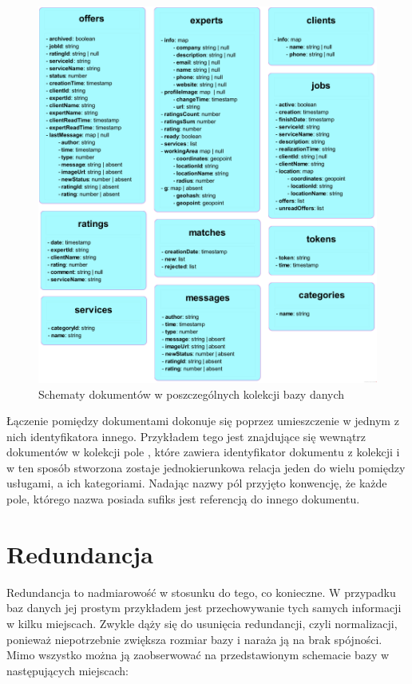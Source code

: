 \begin{figure}[ht!]
  \centering
  \includegraphics[width=\linewidth]{images/db_documents.png}
  \caption{Schematy dokumentów w poszczególnych kolekcji bazy danych}
  \label{fig:baza-dokumenty}
\end{figure}

\pagebreak

Łączenie pomiędzy dokumentami dokonuje się poprzez umieszczenie w jednym z nich identyfikatora innego. Przykładem tego jest znajdujące się wewnątrz dokumentów w kolekcji  pole , które zawiera identyfikator dokumentu z kolekcji  i w ten sposób stworzona zostaje jednokierunkowa relacja jeden do wielu pomiędzy usługami, a ich kategoriami. Nadając nazwy pól przyjęto konwencję, że każde pole, którego nazwa posiada sufiks  jest referencją do innego dokumentu.

\section{Redundancja}

\noindent Redundancja to nadmiarowość w stosunku do tego, co konieczne. W przypadku baz danych jej prostym przykładem jest przechowywanie tych samych informacji w kilku miejscach. Zwykle dąży się do usunięcia redundancji, czyli normalizacji, ponieważ niepotrzebnie zwiększa rozmiar bazy i naraża ją na brak spójności. Mimo wszystko można ją zaobserwować na przedstawionym schemacie bazy w następujących miejscach:

